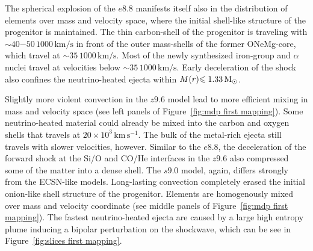 \documentclass[fleqn,usenatbib]{mnras}
\newcommand{\solm}{\ensuremath{\rm{M_{\odot}}}\xspace}
\newcommand{\kms}{\ensuremath{\mathrm{km\, s^{-1}}}}
\begin{document}
The spherical explosion of the $e8.8$ manifests itself also in the distribution of elements over mass and velocity space, where the initial shell-like structure of the progenitor is maintained.
The thin carbon-shell of the progenitor is traveling with $\sim 40\mathord{-}50\,\mathrm{1000\,km/s}$ in front of the outer mass-shells of the former ONeMg-core, which travel at $\sim 35\,\mathrm{1000\,km/s}$. Most of the newly synthesized iron-group and $\alpha$ nuclei travel at velocities below $\sim 35\,\mathrm{1000\,km/s}$.
Early deceleration of the shock also confines the neutrino-heated ejecta within $M(r)\mathord{\le 1.33}\,\solm$.

Slightly more violent convection in the $z9.6$ model lead to more efficient mixing in mass and velocity space (see left panels of Figure~\ref{fig:mdp first mapping}). Some neutrino-heated material could already be mixed into the carbon and oxygen shells that travels at $20\times 10^3\,\kms$. The bulk of the metal-rich ejecta still travels with slower velocities, however. 
Similar to the $e8.8$, the deceleration of the forward shock at the Si/O and CO/He interfaces in the $z9.6$ also compressed some of the matter into a dense shell. 
The $s9.0$ model, again, differs strongly from the ECSN-like models. 
Long-lasting convection completely erased the initial onion-like shell structure of the progenitor. Elements are homogenously mixed over mass and velocity coordinate (see middle panels of Figure~\ref{fig:mdp first mapping}).
The fastest neutrino-heated ejecta are caused by a large high entropy plume inducing a bipolar perturbation on the shockwave, which can be see in Figure~\ref{fig:slices first mapping}.
\end{document}
